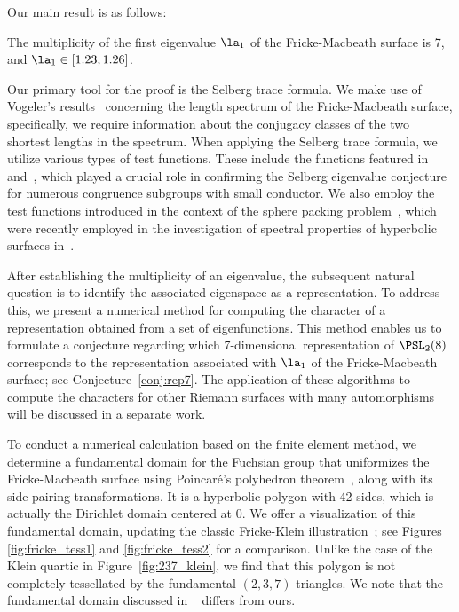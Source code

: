 Our main result is as follows:
\begin{thmnn}
The multiplicity of the first eigenvalue $\la_1$ of the Fricke-Macbeath surface is 7, and $\la_1\in [1.23, 1.26]$.
\end{thmnn}
Our primary tool for the proof is the Selberg trace formula.
We make use of Vogeler's results~\cite{Vogeler2003} concerning the length spectrum of the Fricke-Macbeath surface, specifically, we require information about the conjugacy classes of the two shortest lengths in the spectrum.
When applying the Selberg trace formula, we utilize various types of test functions. 
These include the functions featured in~\cite[Section 4]{MR2338122} and~\cite[Section 5]{MR4186122}, which played a crucial role in confirming the Selberg eigenvalue conjecture for numerous congruence subgroups with small conductor.
We also employ the test functions introduced in the context of the sphere packing problem~\cite[Section 7]{MR1973059}, which were recently employed in the investigation of spectral properties of hyperbolic surfaces in~\cite{FBP21}.

After establishing the multiplicity of an eigenvalue, the subsequent natural question is to identify the associated eigenspace as a representation.
To address this, we present a numerical method for computing the character of a representation obtained from a set of eigenfunctions.
This method enables us to formulate a conjecture regarding which 7-dimensional representation of $\PSL_2(8)$ corresponds to the representation associated with $\la_1$ of the Fricke-Macbeath surface; see Conjecture~\ref{conj:rep7}.
The application of these algorithms to compute the characters for other Riemann surfaces with many automorphisms will be discussed in a separate work.

To conduct a numerical calculation based on the finite element method, we determine a fundamental domain for the Fuchsian group that uniformizes the Fricke-Macbeath surface using Poincar\'{e}'s polyhedron theorem~\cite{maskit1971}, along with its side-pairing transformations.
It is a hyperbolic polygon with 42 sides, which is actually the Dirichlet domain centered at 0.
We offer a visualization of this fundamental domain, updating the classic Fricke-Klein illustration~\cite{MR0352287}; see Figures \ref{fig:fricke_tess1} and \ref{fig:fricke_tess2} for a comparison.
Unlike the case of the Klein quartic in Figure~\ref{fig:237_klein}, we find that this polygon is not completely tessellated by the fundamental $(2,3,7)$-triangles.
We note that the fundamental domain discussed in ~\cite{MR1511059} differs from ours.

